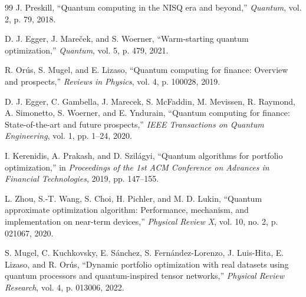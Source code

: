\documentclass[runningheads]{llncs}
\begin{document}
\begin{thebibliography}{99}
J. Preskill, ``Quantum computing in the NISQ era and beyond,''
\textit{Quantum}, vol. 2, p. 79, 2018.

D. J. Egger, J. Mare\v{c}ek, and S. Woerner,
``Warm-starting quantum optimization,''
\textit{Quantum}, vol. 5, p. 479, 2021.

R. Or\'us, S. Mugel, and E. Lizaso,
``Quantum computing for finance: Overview and prospects,''
\textit{Reviews in Physics}, vol. 4, p. 100028, 2019.

D. J. Egger, C. Gambella, J. Marecek, S. McFaddin, M. Mevissen,
R. Raymond, A. Simonetto, S. Woerner, and E. Yndurain,
``Quantum computing for finance: State-of-the-art and future prospects,''
\textit{IEEE Transactions on Quantum Engineering}, vol. 1, pp. 1--24, 2020.

I. Kerenidis, A. Prakash, and D. Szil\'agyi,
``Quantum algorithms for portfolio optimization,''
in \textit{Proceedings of the 1st ACM Conference on Advances in Financial Technologies},
2019, pp. 147--155.

L. Zhou, S.-T. Wang, S. Choi, H. Pichler, and M. D. Lukin,
``Quantum approximate optimization algorithm: Performance, mechanism,
and implementation on near-term devices,''
\textit{Physical Review X}, vol. 10, no. 2, p. 021067, 2020.

S. Mugel, C. Kuchkovsky, E. S\'anchez, S. Fern\'andez-Lorenzo,
J. Luis-Hita, E. Lizaso, and R. Or\'us,
``Dynamic portfolio optimization with real datasets using quantum processors
and quantum-inspired tensor networks,''
\textit{Physical Review Research}, vol. 4, p. 013006, 2022.
\end{thebibliography}
\end{document}
